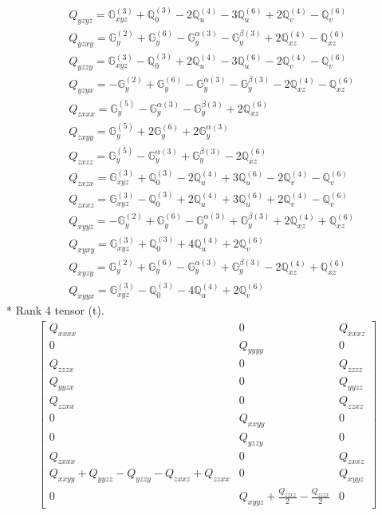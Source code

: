 \documentclass[fleqn,8pt,landscape]{jsarticle}
\begin{document}
\begin{align*}
& Q_{yzyz} = \mathbb{G}_{xyz}^{(3)} + \mathbb{Q}_{0}^{(3)} - 2 \mathbb{Q}_{u}^{(4)} - 3 \mathbb{Q}_{u}^{(6)} + 2 \mathbb{Q}_{v}^{(4)} - \mathbb{Q}_{v}^{(6)} \\
& Q_{yzxy} = \mathbb{G}_{y}^{(2)} + \mathbb{G}_{y}^{(6)} - \mathbb{G}_{y}^{\alpha(3)} - \mathbb{G}_{y}^{\beta(3)} + 2 \mathbb{Q}_{xz}^{(4)} - \mathbb{Q}_{xz}^{(6)} \\
& Q_{yzzy} = \mathbb{G}_{xyz}^{(3)} - \mathbb{Q}_{0}^{(3)} + 2 \mathbb{Q}_{u}^{(4)} - 3 \mathbb{Q}_{u}^{(6)} - 2 \mathbb{Q}_{v}^{(4)} - \mathbb{Q}_{v}^{(6)} \\
& Q_{yzyx} = - \mathbb{G}_{y}^{(2)} + \mathbb{G}_{y}^{(6)} - \mathbb{G}_{y}^{\alpha(3)} - \mathbb{G}_{y}^{\beta(3)} - 2 \mathbb{Q}_{xz}^{(4)} - \mathbb{Q}_{xz}^{(6)} \\
& Q_{zxxx} = \mathbb{G}_{y}^{(5)} - \mathbb{G}_{y}^{\alpha(3)} - \mathbb{G}_{y}^{\beta(3)} + 2 \mathbb{Q}_{xz}^{(6)} \\
& Q_{zxyy} = \mathbb{G}_{y}^{(5)} + 2 \mathbb{G}_{y}^{(6)} + 2 \mathbb{G}_{y}^{\alpha(3)} \\
& Q_{zxzz} = \mathbb{G}_{y}^{(5)} - \mathbb{G}_{y}^{\alpha(3)} + \mathbb{G}_{y}^{\beta(3)} - 2 \mathbb{Q}_{xz}^{(6)} \\
& Q_{zxzx} = \mathbb{G}_{xyz}^{(3)} + \mathbb{Q}_{0}^{(3)} - 2 \mathbb{Q}_{u}^{(4)} + 3 \mathbb{Q}_{u}^{(6)} - 2 \mathbb{Q}_{v}^{(4)} - \mathbb{Q}_{v}^{(6)} \\
& Q_{zxxz} = \mathbb{G}_{xyz}^{(3)} - \mathbb{Q}_{0}^{(3)} + 2 \mathbb{Q}_{u}^{(4)} + 3 \mathbb{Q}_{u}^{(6)} + 2 \mathbb{Q}_{v}^{(4)} - \mathbb{Q}_{v}^{(6)} \\
& Q_{xyyz} = - \mathbb{G}_{y}^{(2)} + \mathbb{G}_{y}^{(6)} - \mathbb{G}_{y}^{\alpha(3)} + \mathbb{G}_{y}^{\beta(3)} + 2 \mathbb{Q}_{xz}^{(4)} + \mathbb{Q}_{xz}^{(6)} \\
& Q_{xyxy} = \mathbb{G}_{xyz}^{(3)} + \mathbb{Q}_{0}^{(3)} + 4 \mathbb{Q}_{u}^{(4)} + 2 \mathbb{Q}_{v}^{(6)} \\
& Q_{xyzy} = \mathbb{G}_{y}^{(2)} + \mathbb{G}_{y}^{(6)} - \mathbb{G}_{y}^{\alpha(3)} + \mathbb{G}_{y}^{\beta(3)} - 2 \mathbb{Q}_{xz}^{(4)} + \mathbb{Q}_{xz}^{(6)} \\
& Q_{xyyx} = \mathbb{G}_{xyz}^{(3)} - \mathbb{Q}_{0}^{(3)} - 4 \mathbb{Q}_{u}^{(4)} + 2 \mathbb{Q}_{v}^{(6)}
\end{align*}
* Rank 4 tensor (t).
\begin{align*}
\begin{bmatrix} Q_{xxxx} & 0 & Q_{xxxz} \\ 0 & Q_{yyyy} & 0 \\ Q_{zzzx} & 0 & Q_{zzzz} \\ Q_{yyzx} & 0 & Q_{yyzz} \\ Q_{zzxx} & 0 & Q_{zzxz} \\ 0 & Q_{xxyy} & 0 \\ 0 & Q_{yzzy} & 0 \\ Q_{zxxx} & 0 & Q_{zxxz} \\ Q_{xxyy} + Q_{yyzz} - Q_{yzzy} - Q_{zxxz} + Q_{zzxx} & 0 & Q_{xyyz} \\ 0 & Q_{xyyz} + \frac{Q_{zzxz}}{2} - \frac{Q_{zzzx}}{2} & 0 \end{bmatrix}
\end{align*}
\end{document}
